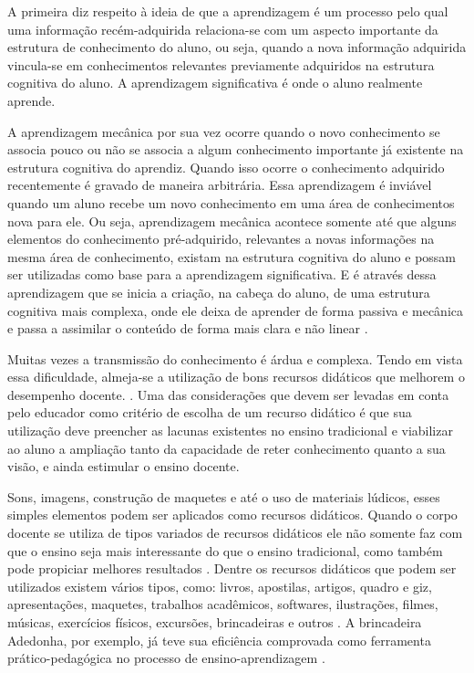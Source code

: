 A primeira diz respeito à ideia de que a aprendizagem é um processo pelo qual uma informação recém-adquirida relaciona-se com um aspecto importante da estrutura de conhecimento do aluno, ou seja, quando a nova informação adquirida vincula-se em conhecimentos relevantes previamente adquiridos na estrutura cognitiva do aluno. A aprendizagem significativa é onde o aluno realmente aprende.

A aprendizagem mecânica por sua vez ocorre quando o novo conhecimento se associa pouco ou não se associa a algum conhecimento importante já existente na estrutura cognitiva do aprendiz. Quando isso ocorre o conhecimento adquirido recentemente é gravado de maneira arbitrária. Essa aprendizagem é inviável quando um aluno recebe um novo conhecimento em uma área de conhecimentos nova para ele. Ou seja, aprendizagem mecânica acontece somente até que alguns elementos do conhecimento pré-adquirido, relevantes a novas informações na mesma área de conhecimento, existam na estrutura cognitiva do aluno e possam ser utilizadas como base para a aprendizagem significativa. E é através dessa aprendizagem que se inicia a criação, na cabeça do aluno, de uma estrutura cognitiva mais complexa, onde ele deixa de aprender de forma passiva e mecânica e passa a assimilar o conteúdo de forma mais clara e não linear \cite{ausubel80}.

Muitas vezes a transmissão do conhecimento é árdua e complexa. Tendo em vista essa dificuldade, almeja-se a utilização de bons recursos didáticos que melhorem o desempenho docente. \cite{souza07}. Uma das considerações que devem ser levadas em conta pelo educador como critério de escolha de um recurso didático é que sua utilização deve preencher as lacunas existentes no ensino tradicional e viabilizar ao aluno a ampliação 
tanto da capacidade de reter conhecimento quanto a sua visão, e ainda estimular o ensino docente. \cite{trivelato06}

Sons, imagens, construção de maquetes e até o uso de materiais lúdicos, esses simples elementos podem ser aplicados como recursos didáticos. Quando o corpo docente se utiliza de tipos variados de recursos didáticos ele não somente faz com que o ensino seja mais interessante do que o ensino tradicional, como também pode propiciar melhores resultados \cite{parra85} \cite{souza07} \cite{costoldi09}. Dentre os recursos didáticos que podem ser utilizados existem vários tipos, como: livros, apostilas, artigos, quadro e giz, apresentações, maquetes, trabalhos acadêmicos, softwares, ilustrações, filmes, músicas, exercícios físicos, excursões, brincadeiras e outros \cite{ferreira07}. A brincadeira Adedonha, por exemplo, já teve sua eficiência comprovada como ferramenta prático-pedagógica no processo de ensino-aprendizagem \cite{silva18}.

